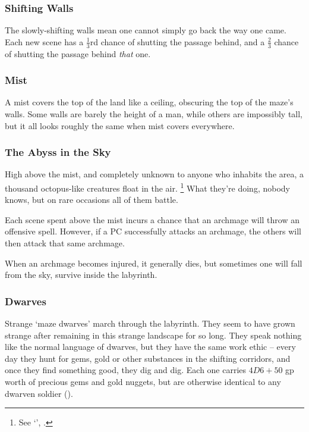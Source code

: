 \begin{multicols}{2}
\subsubsection{Shifting Walls}

The slowly-shifting walls mean one cannot simply go back the way one came.
Each new scene has a $\frac{1}{3}$rd chance of shutting the passage behind, and a $\frac{2}{3}$ chance of shutting the passage behind \emph{that} one.

\subsubsection{Mist}

A mist covers the top of the land like a ceiling, obscuring the top of the maze's walls.
Some walls are barely the height of a man, while others are impossibly tall, but it all looks roughly the same when mist covers everywhere.

\subsubsection{The Abyss in the Sky}

High above the mist, and completely unknown to anyone who inhabits the area, a thousand octopus-like creatures float in the air.
\footnote{See `', .}
What they're doing, nobody knows, but on rare occasions all of them battle.

Each scene spent above the mist incurs a chance that an archmage will throw an offensive spell.
However, if a PC successfully attacks an archmage, the others will then attack that same archmage.

When an archmage becomes injured, it generally dies, but sometimes one will fall from the sky, survive inside the labyrinth.

\subsubsection{Dwarves}

Strange `maze dwarves' march through the labyrinth.
They seem to have grown strange after remaining in this strange landscape for so long.
They speak nothing like the normal language of dwarves, but they have the same work ethic -- every day they hunt for gems, gold or other substances in the shifting corridors, and once they find something good, they dig and dig.
Each one carries $4D6 + 50$ gp worth of precious gems and gold nuggets, but are otherwise identical to any dwarven soldier ().


\end{multicols}
